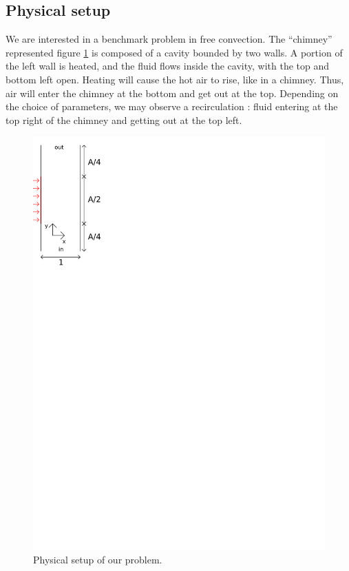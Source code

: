 \documentclass[12pt]{article}
\begin{document}
\subsection{Physical setup}
We are interested in a benchmark problem in free convection. The
``chimney'' represented figure \ref{fig:schema} is composed of a
cavity bounded by two walls. A portion of the left wall is heated, and
the fluid flows inside the cavity, with the top and bottom left
open. Heating will cause the hot air to rise, like in a chimney. Thus,
air will enter the chimney at the bottom and get out at the
top. Depending on the choice of parameters, we may observe a
recirculation : fluid entering at the top right of the chimney and
getting out at the top left.

\begin{figure}[htb]
\centering
\includegraphics{figs/schema}
\caption{Physical setup of our problem.}
\label{fig:schema}
\end{figure}
\end{document}
